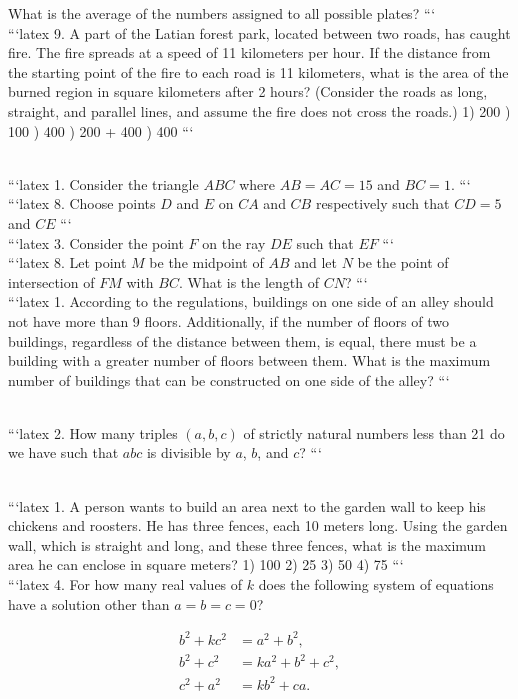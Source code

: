 What is the average of the numbers assigned to all possible plates?
```
\\
```latex
9. A part of the Latian forest park, located between two roads, has caught fire. The fire spreads at a speed of 11 kilometers per hour. If the distance from the starting point of the fire to each road is 11 kilometers, what is the area of the burned region in square kilometers after 2 hours? (Consider the roads as long, straight, and parallel lines, and assume the fire does not cross the roads.)
1) 200 ) 100 ) 400 ) 200 + 400 ) 400
```

\\
```latex
1. Consider the triangle $ABC$ where $AB = AC = 15$ and $BC = 1$.
```
\\
```latex
8. Choose points $D$ and $E$ on $CA$ and $CB$ respectively such that $CD = 5$ and $CE$
```
\\
```latex
3. Consider the point $F$ on the ray $DE$ such that $EF$
```
\\
```latex
8. Let point $M$ be the midpoint of $AB$ and let $N$ be the point of intersection of $FM$ with $BC$. What is the length of $CN$?
```
\\
```latex
1. According to the regulations, buildings on one side of an alley should not have more than 9 floors. Additionally, if the number of floors of two buildings, regardless of the distance between them, is equal, there must be a building with a greater number of floors between them. What is the maximum number of buildings that can be constructed on one side of the alley?
```

\\
```latex
2. How many triples $(a, b, c)$ of strictly natural numbers less than 21 do we have such that $abc$ is divisible by $a$, $b$, and $c$?
```

\\
```latex
1. A person wants to build an area next to the garden wall to keep his chickens and roosters. He has three fences, each 10 meters long. Using the garden wall, which is straight and long, and these three fences, what is the maximum area he can enclose in square meters?
1) 100 2) 25 3) 50 4) 75
```
\\
```latex
4. For how many real values of $k$ does the following system of equations have a solution other than $a = b = c = 0$?

\[
\begin{align*}
b^2 + kc^2 &= a^2 + b^2, \\
b^2 + c^2 &= ka^2 + b^2 + c^2, \\
c^2 + a^2 &= kb^2 + ca.
\end{align*}
\]

